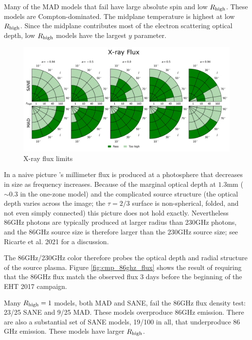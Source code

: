 Many of the MAD models that fail have large absolute spin and low $R_\mathrm{high}$.  These models are Compton-dominated.  The midplane temperature is highest at low $R_\mathrm{high}$.  Since the midplane contributes most of the electron scattering optical depth, low $R_\mathrm{high}$ models have the largest $y$ parameter.

\begin{figure}
  \centering
  \includegraphics[width=\columnwidth]{./figures/Xray_flux_Constraints.png}
  \caption{X-ray flux limits}
  \label{fig:cmp_xray_flux}
\end{figure}


In a naive picture \sgra's millimeter flux is produced at a photosphere that decreases in size as frequency increases.  Because of the marginal optical depth at $1.3$mm ($\sim 0.3$ in the one-zone model) and the complicated source structure (the optical depth varies across the image; the $\tau = 2/3$ surface is non-spherical, folded, and not even simply connected) this picture does not hold exactly.  Nevertheless 86GHz photons are typically produced at larger radius than 230GHz photons, and the 86GHz source size is therefore larger than the 230GHz source size; see Ricarte et al. 2021 for a discussion.

The 86GHz/230GHz color therefore probes the optical depth and radial structure of the source plasma.  Figure \ref{fig:cmp_86ghz_flux} shows the result of requiring that the 86GHz flux match the observed flux 3 days before the beginning of the EHT 2017 campaign.

Many $R_\mathrm{high} = 1$ models, both MAD and SANE, fail the $86$GHz flux density test: 23/25 SANE and 9/25 MAD.  These models overproduce $86$GHz emission.
There are also a substantial set of SANE models, 19/100 in all, that underproduce $86$GHz emission.  These models have larger $R_\mathrm{high}$.

